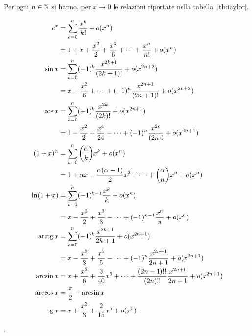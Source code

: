 \begin{theorem}
\label{th:sviluppi_taylor}
\mymark{***}
Per ogni $n\in \mathbb N$ si hanno, per $x\to 0$
le relazioni riportate nella tabella~\ref{tb:taylor}.
\end{theorem}
\begin{table}
\begin{align*}
e^x &= \sum_{k=0}^n \frac{x^k}{k!} + o(x^n) \\
  &= 1 + x + \frac{x^2}{2} + \frac {x^3}{6} + \dots + \frac{x^n}{n!} + o(x^n) \\
\sin x &= \sum_{k=0}^n (-1)^k\frac{x^{2k+1}}{(2k+1)!} + o(x^{2n+2}) \\
 &= x - \frac{x^3}{6} + \dots + (-1)^{n} \frac{x^{2n+1}}{(2n+1)!}  + o(x^{2n+2})\\
 \cos x &= \sum_{k=0}^n (-1)^k \frac{x^{2k}}{(2k)!} + o(x^{2n+1}) \\
   &= 1 - \frac{x^2}{2} + \frac{x^4}{24} - \dots + (-1)^n\frac{x^{2n}}{(2n)!} + o(x^{2n+1})\\
 (1+x)^\alpha &= \sum_{k=0}^n {\alpha \choose k} x^k + o(x^n)\\
    &= 1 + \alpha x + \frac{\alpha (\alpha-1)}{2} x^2 + \dots + {\alpha \choose n} x^n + o(x^n) \\
  \ln (1+x) &= \sum_{k=1}^n (-1)^{k-1} \frac{x^k}{k} + o(x^n) \\
         &= x - \frac{x^2}{2} + \frac{x^3}{3} - \dots + (-1)^{n-1}\frac{x^n}{n} + o(x^n) \\
  \operatorname{arctg} x &= \sum_{k=0}^n (-1)^k \frac{x^{2k+1}}{2k+1} + o(x^{2n+1})\\
    &= x - \frac{x^3}{3} + \frac{x^5}{5} - \dots + (-1)^n \frac{x^{2n+1}}{2n +1} + o(x^{2n+1})\\
  \arcsin x &= x + \frac{x^3}{6} + \frac{3}{40} x^5 + \dots + \frac{(2n-1)!!}{(2n)!!} \frac{x^{2n+1}}{2n+1} + o(x^{2n+1}) \\
  \arccos x &= \frac \pi 2 - \arcsin x\\
  \operatorname{tg} x &= x + \frac{x^3}{3} + \frac{2}{15} x^5 + o(x^5).
\end{align*}
\caption{sviluppi di Taylor, per $x\to 0$, di alcune funzioni elementari.
%
%
Si veda il teorema~\ref{th:sviluppi_taylor}}.
\label{tb:taylor}%
\end{table}
%
